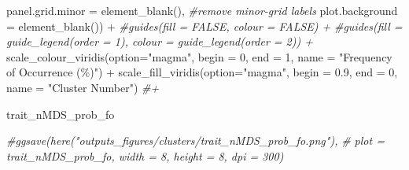 \documentclass[
]{article}
\newenvironment{Shaded}{\begin{snugshade}}{\end{snugshade}}
\newcommand{\AttributeTok}[1]{\textcolor[rgb]{0.77,0.63,0.00}{#1}}
\newcommand{\CommentTok}[1]{\textcolor[rgb]{0.56,0.35,0.01}{\textit{#1}}}
\newcommand{\DecValTok}[1]{\textcolor[rgb]{0.00,0.00,0.81}{#1}}
\newcommand{\FloatTok}[1]{\textcolor[rgb]{0.00,0.00,0.81}{#1}}
\newcommand{\FunctionTok}[1]{\textcolor[rgb]{0.00,0.00,0.00}{#1}}
\newcommand{\NormalTok}[1]{#1}
\newcommand{\SpecialCharTok}[1]{\textcolor[rgb]{0.00,0.00,0.00}{#1}}
\newcommand{\StringTok}[1]{\textcolor[rgb]{0.31,0.60,0.02}{#1}}
\begin{document}
\begin{Shaded}
\begin{Highlighting}[]
        \AttributeTok{panel.grid.minor =} \FunctionTok{element\_blank}\NormalTok{(),  }\CommentTok{\#remove minor{-}grid labels}
        \AttributeTok{plot.background =} \FunctionTok{element\_blank}\NormalTok{()) }\SpecialCharTok{+}
  \CommentTok{\#guides(fill = FALSE, colour = FALSE) +}
  \CommentTok{\#guides(fill = guide\_legend(order = 1), colour = guide\_legend(order = 2)) +}
  \FunctionTok{scale\_colour\_viridis}\NormalTok{(}\AttributeTok{option=}\StringTok{"magma"}\NormalTok{, }\AttributeTok{begin =} \DecValTok{0}\NormalTok{, }\AttributeTok{end =} \DecValTok{1}\NormalTok{, }\AttributeTok{name =} \StringTok{"Frequency of Occurrence (\%)"}\NormalTok{) }\SpecialCharTok{+} 
  \FunctionTok{scale\_fill\_viridis}\NormalTok{(}\AttributeTok{option=}\StringTok{"magma"}\NormalTok{, }\AttributeTok{begin =} \FloatTok{0.9}\NormalTok{, }\AttributeTok{end =} \DecValTok{0}\NormalTok{, }\AttributeTok{name =} \StringTok{"Cluster Number"}\NormalTok{) }\CommentTok{\#+}
  
\NormalTok{trait\_nMDS\_prob\_fo}


\CommentTok{\#ggsave(here("outputs\_figures/clusters/trait\_nMDS\_prob\_fo.png"), }
\CommentTok{\#       plot = trait\_nMDS\_prob\_fo, width = 8, height = 8, dpi = 300)}
\end{Highlighting}
\end{Shaded}
\end{document}
